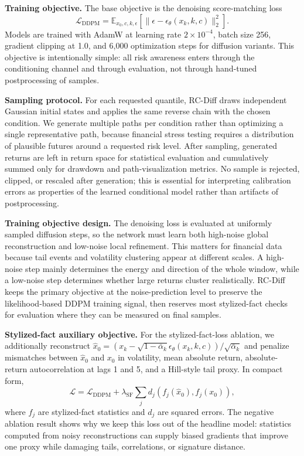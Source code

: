 \documentclass[letterpaper]{article}
\begin{document}
\textbf{Training objective.} The base objective is the denoising score-matching loss
\begin{equation}
  \mathcal{L}_{\mathrm{DDPM}}=\mathbb{E}_{x_0,c,k,\epsilon}\left[\|\epsilon-\epsilon_\theta(x_k,k,c)\|_2^2\right].
\end{equation}
Models are trained with AdamW at learning rate $2\times10^{-4}$, batch size 256, gradient clipping at 1.0, and 6,000 optimization steps for diffusion variants. This objective is intentionally simple: all risk awareness enters through the conditioning channel and through evaluation, not through hand-tuned postprocessing of samples.

\textbf{Sampling protocol.} For each requested quantile, RC-Diff draws independent Gaussian initial states and applies the same reverse chain with the chosen condition. We generate multiple paths per condition rather than optimizing a single representative path, because financial stress testing requires a distribution of plausible futures around a requested risk level. After sampling, generated returns are left in return space for statistical evaluation and cumulatively summed only for drawdown and path-visualization metrics. No sample is rejected, clipped, or rescaled after generation; this is essential for interpreting calibration errors as properties of the learned conditional model rather than artifacts of postprocessing.

\textbf{Training objective design.} The denoising loss is evaluated at uniformly sampled diffusion steps, so the network must learn both high-noise global reconstruction and low-noise local refinement. This matters for financial data because tail events and volatility clustering appear at different scales. A high-noise step mainly determines the energy and direction of the whole window, while a low-noise step determines whether large returns cluster realistically. RC-Diff keeps the primary objective at the noise-prediction level to preserve the likelihood-based DDPM training signal, then reserves most stylized-fact checks for evaluation where they can be measured on final samples.

\textbf{Stylized-fact auxiliary objective.} For the stylized-fact-loss ablation, we additionally reconstruct $\hat{x}_0=(x_k-\sqrt{1-\bar{\alpha}_k}\epsilon_\theta(x_k,k,c))/\sqrt{\bar{\alpha}_k}$ and penalize mismatches between $\hat{x}_0$ and $x_0$ in volatility, mean absolute return, absolute-return autocorrelation at lags 1 and 5, and a Hill-style tail proxy. In compact form,
\begin{equation}
  \mathcal{L}=\mathcal{L}_{\mathrm{DDPM}}+\lambda_{\mathrm{SF}}\sum_j d_j(f_j(\hat{x}_0),f_j(x_0)),
\end{equation}
where $f_j$ are stylized-fact statistics and $d_j$ are squared errors. The negative ablation result shows why we keep this loss out of the headline model: statistics computed from noisy reconstructions can supply biased gradients that improve one proxy while damaging tails, correlations, or signature distance.
\end{document}
